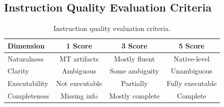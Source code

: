 \documentclass[11pt,a4paper]{article}
\begin{document}
\subsection{Instruction Quality Evaluation Criteria}

\begin{table}[h]
\centering
\small
\begin{tabular}{lccc}
\toprule
\textbf{Dimension} & \textbf{1 Score} & \textbf{3 Score} & \textbf{5 Score} \\
\midrule
Naturalness & MT artifacts & Mostly fluent & Native-level \\
Clarity & Ambiguous & Some ambiguity & Unambiguous \\
Executability & Not executable & Partially & Fully executable \\
Completeness & Missing info & Mostly complete & Complete \\
\bottomrule
\end{tabular}
\caption{Instruction quality evaluation criteria.}
\end{table}
\end{document}
